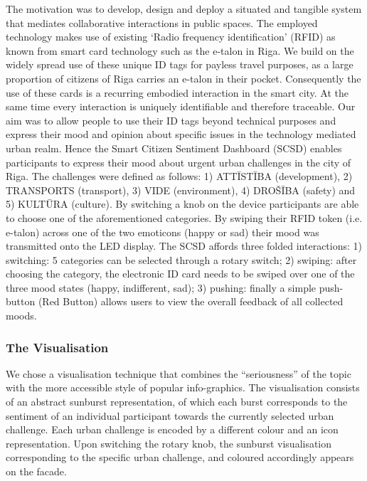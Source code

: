 The motivation was to develop, design and deploy a situated and tangible system that mediates collaborative interactions in public spaces. 
The employed technology makes use of existing ‘Radio frequency identification’ (RFID) as known from smart card technology such as the e-talon in Riga. 
We build on the widely spread use of these unique ID tags for payless travel purposes, as a large proportion of citizens of Riga carries an e-talon in their pocket. 
Consequently the use of these cards is a recurring embodied interaction in the smart city. 
At the same time every interaction is uniquely identifiable and therefore traceable. 
Our aim was to allow people to use their ID tags beyond technical purposes and express their mood and opinion about specific issues in the technology mediated urban realm. 
Hence the Smart Citizen Sentiment Dashboard (SCSD) enables participants to express their mood about urgent urban challenges in the city of Riga. 
The challenges were defined as follows: 1) ATTĪSTĪBA (development), 2) TRANSPORTS (transport), 3) VIDE (environment), 4) DROŠĪBA (safety) and 5) KULTŪRA (culture). 
By switching a knob on the device participants are able to choose one of the aforementioned categories. By swiping their RFID token (i.e. e-talon) across one of the two emoticons (happy or sad) their mood was transmitted onto the LED display. 
The SCSD affords three folded interactions: 1) switching: 5 categories can be selected through a rotary switch; 2) swiping: after choosing the category, the electronic ID card needs to be swiped over one of the three mood states (happy, indifferent, sad); 3) pushing: finally a simple push-button (Red Button) allows users to view the overall feedback of all collected moods.

\subsubsection{The Visualisation}

We chose a visualisation technique that combines the “seriousness” of the topic with the more accessible style of popular info-graphics. 
The visualisation consists of an abstract sunburst representation, of which each burst corresponds to the sentiment of an individual participant towards the currently selected urban challenge. 
Each urban challenge is encoded by a different colour and an icon representation. 
Upon switching the rotary knob, the sunburst visualisation corresponding to the specific urban challenge, and coloured accordingly appears on the facade.

